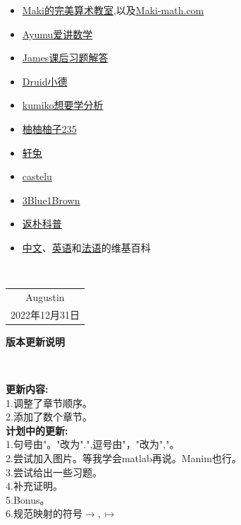 \documentclass[12pt, a4paper, oneside]{ctexbook}
\begin{document}
\begin{itemize}
  \item \href{https://space.bilibili.com/391930545}{Maki的完美算术教室},以及\href{https://www.maki-math.com/#/}{Maki-math.com}
  \item \href{https://space.bilibili.com/1632276842}{Ayumu爱讲数学}
  \item \href{https://space.bilibili.com/29977151}{James课后习题解答}
  \item \href{https://space.bilibili.com/6073855}{Druid小德}
  \item \href{https://space.bilibili.com/3156848}{kumiko想要学分析}
  \item \href{https://space.bilibili.com/586867165}{柚柚柚子235}
  \item \href{https://space.bilibili.com/20883932}{轩兔}
  \item \href{https://space.bilibili.com/184538069}{castelu}
  \item \href{https://space.bilibili.com/88461692}{3Blue1Brown}
  \item \href{https://space.bilibili.com/415941398}{返朴科普}
  \item \href{https://zh.wikipedia.org/wiki/Wikipedia:%E9%A6%96%E9%A1%B5}{中文}、\href{https://en.wikipedia.org/wiki/Main_Page}{英语}和\href{https://fr.wikipedia.org/wiki/Wikip%C3%A9dia:Accueil_principal}{法语}的维基百科
\end{itemize}


~\\
\begin{flushright}
    \begin{tabular}{c}
        Augustin\\
        2022年12月31日
    \end{tabular}
\end{flushright}


\newpage
\begin{center}
  \Huge\textbf{版本更新说明}
\end{center}~\


\noindent
\textbf{更新内容:}\\
1.调整了章节顺序。\\
2.添加了数个章节。\\

\noindent
\textbf{计划中的更新:}\\
1.句号由"。"改为".",逗号由"，"改为","。\\
2.尝试加入图片。等我学会matlab再说。Manim也行。\\
3.尝试给出一些习题。\\
4.补充证明。\\
5.Bonus。\\
6.规范映射的符号$\rightarrow,\mapsto $
\end{document}
